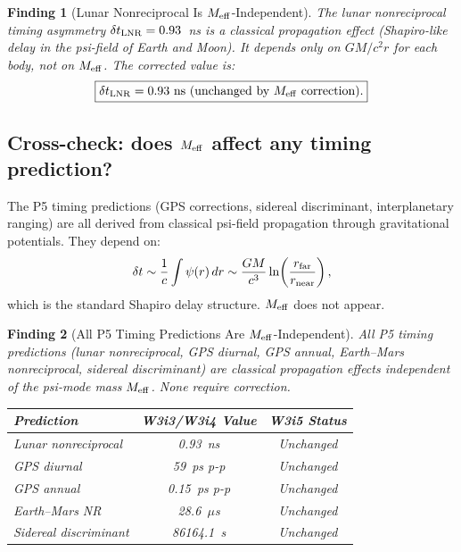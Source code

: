 \documentclass[11pt]{article}
\newtheorem{finding}{Finding}
\newcommand{\Meff}{M_{\rm eff}}
\begin{document}
\begin{finding}[Lunar Nonreciprocal Is $\Meff$-Independent]
\label{find:LNR-Meff}
The lunar nonreciprocal timing asymmetry $\delta t_{\rm LNR} = 0.93$~ns
is a classical propagation effect (Shapiro-like delay in the psi-field of
Earth and Moon). It depends only on $GM/c^2 r$ for each body, not on
$\Meff$. The corrected value is:
\begin{equation}
\boxed{\delta t_{\rm LNR} = 0.93~\text{ns (unchanged by } \Meff \text{ correction).}}
\end{equation}
\end{finding}

\subsection{Cross-check: does $\Meff$ affect any timing prediction?}

The P5 timing predictions (GPS corrections, sidereal discriminant,
interplanetary ranging) are all derived from classical psi-field propagation
through gravitational potentials. They depend on:
\begin{equation}
\delta t \sim \frac{1}{c}\int \psi(r)\,dr \sim \frac{GM}{c^3}\ln\!\left(\frac{r_{\rm far}}{r_{\rm near}}\right),
\label{eq:timing-general}
\end{equation}
which is the standard Shapiro delay structure. $\Meff$ does not appear.

\begin{finding}[All P5 Timing Predictions Are $\Meff$-Independent]
\label{find:all-timing-Meff}
All P5 timing predictions (lunar nonreciprocal, GPS diurnal, GPS annual,
Earth--Mars nonreciprocal, sidereal discriminant) are classical propagation
effects independent of the psi-mode mass $\Meff$. None require correction.

\begin{tabular}{lcc}
\toprule
\textbf{Prediction} & \textbf{W3i3/W3i4 Value} & \textbf{W3i5 Status} \\
\midrule
Lunar nonreciprocal & 0.93~ns & Unchanged \\
GPS diurnal & 59~ps p-p & Unchanged \\
GPS annual & 0.15~ps p-p & Unchanged \\
Earth--Mars NR & 28.6~$\mu$s & Unchanged \\
Sidereal discriminant & 86164.1~s & Unchanged \\
\bottomrule
\end{tabular}
\end{finding}
\end{document}
